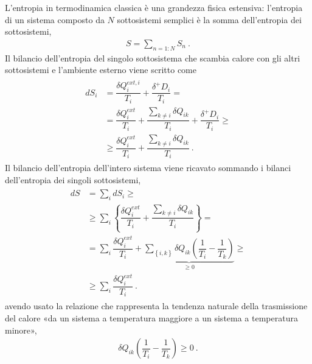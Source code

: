 \documentclass[letterpaper,10pt,italian]{jupyterBook}
\begin{document}
\sphinxAtStartPar
L’entropia in termodinamica classica è una grandezza fisica estensiva: l’entropia di un sistema composto da \(N\) sotto\sphinxhyphen{}sistemi semplici è la somma dell’entropia dei sotto\sphinxhyphen{}sistemi,
\begin{equation*}
\begin{split}S = \sum_{n=1:N} S_n \ .\end{split}
\end{equation*}
\sphinxAtStartPar
Il bilancio dell’entropia del singolo sotto\sphinxhyphen{}sistema che scambia calore con gli altri sotto\sphinxhyphen{}sistemi e l’ambiente esterno viene scritto come
\begin{equation*}
\begin{split}\begin{aligned}
    dS_i & = \dfrac{\delta Q^{ext,i}_i}{T_i} + \dfrac{\delta^+ D_i}{T_i} = \\
         & = \dfrac{\delta Q^{ext}_i}{T_i} + \dfrac{\sum_{k \ne i} \delta Q_{ik}}{T_i} + \dfrac{\delta^+ D_i}{T_i} \ge \\
         & \ge \dfrac{\delta Q^{ext}_i}{T_i} + \dfrac{\sum_{k \ne i} \delta Q_{ik}}{T_i} \ . 
  \end{aligned}\end{split}
\end{equation*}
\sphinxAtStartPar
Il bilancio dell’entropia dell’intero sistema viene ricavato sommando i bilanci dell’entropia dei singoli sotto\sphinxhyphen{}sistemi,
\begin{equation*}
\begin{split}\begin{aligned}
    dS & = \sum_i d S_i \ge \\
       & \ge \sum_i \left\{ \dfrac{\delta Q^{ext}_i}{T_i} + \dfrac{\sum_{k \ne i} \delta Q_{ik}}{T_i} \right\} = \\
       & = \sum_i \dfrac{\delta Q^{ext}_i}{T_i} + \underbrace{\sum_{\left\{i,k\right\}} \delta Q_{ik} \left( \dfrac{1}{T_i} - \dfrac{1}{T_k} \right)}_{\ge 0} \ge \\
       & \ge \sum_i \dfrac{\delta Q^{ext}_i}{T_i} \ . 
  \end{aligned}\end{split}
\end{equation*}
\sphinxAtStartPar
avendo usato la relazione che rappresenta la tendenza naturale della trasmissione del calore «da un sistema a temperatura maggiore a un sistema a temperatura minore»,
\begin{equation*}
\begin{split}\delta Q_{ik} \left( \dfrac{1}{T_i} - \dfrac{1}{T_k} \right) \ge 0 \ .\end{split}
\end{equation*}
\sphinxAtStartPar
{} 
\end{document}
